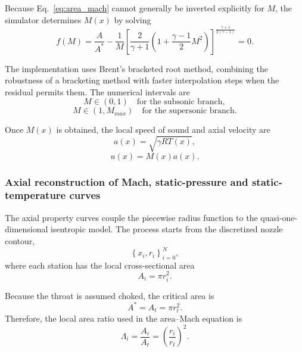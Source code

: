 Because Eq.~\eqref{eq:area_mach} cannot generally be inverted explicitly for $M$, the simulator determines $M(x)$ by solving
\begin{equation}
f(M)=\frac{A}{A^*} - \frac{1}{M}
\left[
\frac{2}{\gamma+1}
\left(1+\frac{\gamma-1}{2}M^2\right)
\right]^{\frac{\gamma+1}{2(\gamma-1)}}=0 .
\label{eq:area_mach_residual}
\end{equation}

The implementation uses Brent's bracketed root method, combining the robustness of a bracketing method with faster interpolation steps when the residual permits them. The numerical intervals are
\begin{equation}
M\in(0,1) \quad \text{for the subsonic branch},
\end{equation}
\begin{equation}
M\in(1,M_{max}) \quad \text{for the supersonic branch}.
\end{equation}

Once $M(x)$ is obtained, the local speed of sound and axial velocity are
\begin{equation}
a(x)=\sqrt{\gamma R T(x)},
\end{equation}
\begin{equation}
u(x)=M(x)a(x).
\label{eq:velocity}
\end{equation}


\subsubsection{Axial reconstruction of Mach, static-pressure and static-temperature curves}

The axial property curves couple the piecewise radius function to the
quasi-one-dimensional isentropic model. The process starts from the discretized
nozzle contour,
\begin{equation}
\left\{x_i,r_i\right\}_{i=0}^{N},
\end{equation}
where each station has the local cross-sectional area
\begin{equation}
A_i=\pi r_i^2.
\label{eq:local_area_discrete}
\end{equation}

Because the throat is assumed choked, the critical area is
\begin{equation}
A^*=A_t=\pi r_t^2.
\end{equation}
Therefore, the local area ratio used in the area--Mach equation is
\begin{equation}
\Lambda_i=\frac{A_i}{A_t}=\left(\frac{r_i}{r_t}\right)^2.
\label{eq:local_area_ratio_discrete}
\end{equation}

